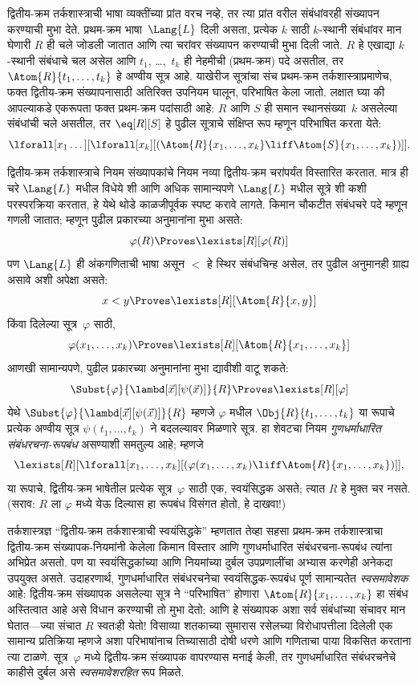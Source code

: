 द्वितीय-क्रम तर्कशास्त्राची भाषा व्यक्तींच्या प्रांत वरच नव्हे, तर त्या
प्रांत वरील संबंधांवरही संख्यापन करण्याची मुभा देते. प्रथम-क्रम
भाषा~$\Lang{L}$ दिली असता, प्रत्येक $k$ साठी $k$-स्थानी संबंधांवर मान घेणारी
$R$ ही चले जोडली जातात आणि त्या चरांवर संख्यापन करण्याची मुभा दिली
जाते. $R$ हे एखाद्या $k$-स्थानी संबंधाचे चल असेल आणि $t_1$,
\dots,~$t_k$ ही नेहमीची (प्रथम-क्रम) पदे असतील, तर
$\Atom{R}{t_1,\dots,t_k}$ हे अण्वीय सूत्र आहे. याखेरीज सूत्रांचा
संच प्रथम-क्रम तर्कशास्त्राप्रमाणेच, फक्त द्वितीय-क्रम संख्यापनासाठी अतिरिक्त
उपनियम घालून, परिभाषित केला जातो. लक्षात घ्या की आपल्याकडे एकरूपता फक्त
प्रथम-क्रम पदांसाठी आहे: $R$ आणि $S$ ही समान स्थानसंख्या~$k$ असलेल्या
संबंधांची चले असतील, तर $\eq[R][S]$ हे पुढील सूत्राचे संक्षिप्त रूप
म्हणून परिभाषित करता येते:
\[\lforall[x_1 \dots][\lforall[x_k][(\Atom{R}{x_1, \dots, x_k} \liff
  \Atom{S}{x_1, \dots, x_k})]].
\]

द्वितीय-क्रम तर्कशास्त्राचे नियम संख्यापकांचे नियम नव्या द्वितीय-क्रम चरांपर्यंत
विस्तारित करतात. मात्र ही चरे $\Lang{L}$ मधील विधेये शी आणि अधिक
सामान्यपणे $\Lang{L}$ मधील सूत्रे शी कशी परस्परक्रिया करतात, हे येथे
थोडे काळजीपूर्वक स्पष्ट करावे लागते. किमान चौकटीत संबंधचरे पदे म्हणून गणली
जातात; म्हणून पुढील प्रकारच्या अनुमानांना मुभा असते:
\[\varphi(R) \Proves \lexists[R][\varphi(R)]
\]
पण $\Lang{L}$ ही अंकगणिताची भाषा असून $<$ हे स्थिर संबंधचिन्ह असेल, तर पुढील
अनुमानही ग्राह्य असावे अशी अपेक्षा असते:
\[x < y \Proves \lexists[R][\Atom{R}{x,y}]
\]
किंवा दिलेल्या सूत्र~$\varphi$ साठी,
\[\varphi(x_1, \dots, x_k) \Proves \lexists[R][\Atom{R}{x_1,\dots,x_k}]
\]
आणखी सामान्यपणे, पुढील प्रकारच्या अनुमानांना मुभा द्यावीशी वाटू शकते:
\[\Subst{\varphi}{\lambd[\vec x][\psi(\vec x)]}{R} \Proves
\lexists[R][\varphi]
\]
येथे $\Subst{\varphi}{\lambd[\vec x][\psi(\vec x)]}{R}$ म्हणजे $\varphi$ मधील
$\Obj{R}{t_1,\dots,t_k}$ या रूपाचे प्रत्येक अण्वीय सूत्र
$\psi(t_1, \dots, t_k)$ ने बदलल्यावर मिळणारे सूत्र. हा शेवटचा नियम
{\em गुणधर्माधारित संबंधरचना-रूपबंध} असण्याशी समतुल्य आहे; म्हणजे
\[\lexists[R][\lforall[x_1, \dots, x_k][(\varphi(x_1, \dots, x_k) \liff
\Atom{R}{x_1, \dots, x_k})]],
\]
या रूपाचे, द्वितीय-क्रम भाषेतील प्रत्येक सूत्र~$\varphi$ साठी एक,
स्वयंसिद्धक असते; त्यात $R$ हे मुक्त चर नसते. (सराव: $R$ ला $\varphi$ मध्ये येऊ
दिल्यास हा रूपबंध विसंगत होतो, हे दाखवा!)

तर्कशास्त्रज्ञ “द्वितीय-क्रम तर्कशास्त्राची स्वयंसिद्धके” म्हणतात तेव्हा
सहसा प्रथम-क्रम तर्कशास्त्राचा द्वितीय-क्रम संख्यापक-नियमांनी केलेला किमान
विस्तार आणि गुणधर्माधारित संबंधरचना-रूपबंध त्यांना अभिप्रेत असतो. पण या
स्वयंसिद्धकांच्या आणि नियमांच्या दुर्बल उपप्रणालींचा अभ्यास करणेही अनेकदा
उपयुक्त असते. उदाहरणार्थ, गुणधर्माधारित संबंधरचनेचा स्वयंसिद्धक-रूपबंध पूर्ण
सामान्यतेत \emph{स्वसमावेशक} आहे: द्वितीय-क्रम संख्यापक असलेल्या
सूत्र ने “परिभाषित” होणारा $\Atom{R}{x_1, \dots, x_k}$ हा संबंध
अस्तित्वात आहे असे विधान करण्याची तो मुभा देतो; आणि हे संख्यापक अशा सर्व
संबंधांच्या संचावर मान घेतात---ज्या संचात $R$ स्वतःही येतो!{} विसाव्या
शतकाच्या सुमारास रसेलच्या विरोधापत्तीला दिलेली एक सामान्य प्रतिक्रिया म्हणजे
अशा परिभाषांनाच तिच्यासाठी दोषी धरणे आणि गणिताचा पाया विकसित करताना त्या
टाळणे. सूत्र~$\varphi$ मध्ये द्वितीय-क्रम संख्यापक वापरण्यास मनाई केली, तर
गुणधर्माधारित संबंधरचनेचे काहीसे दुर्बल असे {\em स्वसमावेशरहित} रूप मिळते.

